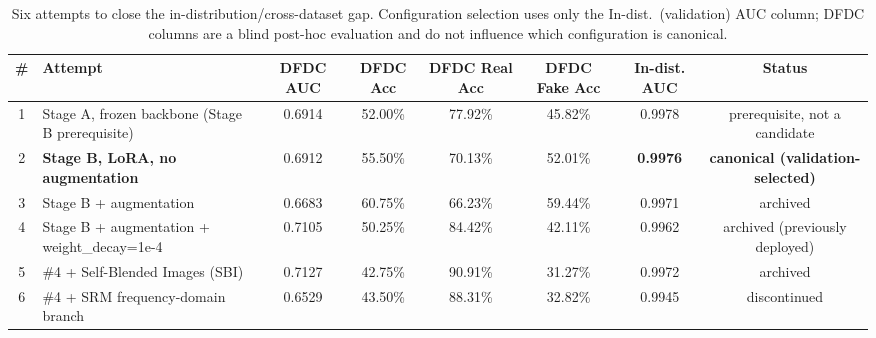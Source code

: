 \documentclass[conference]{IEEEtran}
\begin{document}
\begin{table}[t]
\caption{Six attempts to close the in-distribution/cross-dataset gap. Configuration selection uses only the In-dist.\ (validation) AUC column; DFDC columns are a blind post-hoc evaluation and do not influence which configuration is canonical.}
\label{tab:generalization}
\centering
\begin{tabular}{@{}clccccc c@{}}
\toprule
\# & Attempt & DFDC AUC & DFDC Acc & DFDC Real Acc & DFDC Fake Acc & In-dist. AUC & Status \\
\midrule
1 & Stage A, frozen backbone (Stage B prerequisite) & 0.6914 & 52.00\% & 77.92\% & 45.82\% & 0.9978 & prerequisite, not a candidate \\
2 & \textbf{Stage B, LoRA, no augmentation} & 0.6912 & 55.50\% & 70.13\% & 52.01\% & \textbf{0.9976} & \textbf{canonical (validation-selected)} \\
3 & Stage B + augmentation & 0.6683 & 60.75\% & 66.23\% & 59.44\% & 0.9971 & archived \\
4 & Stage B + augmentation + weight\_decay=1e-4 & 0.7105 & 50.25\% & 84.42\% & 42.11\% & 0.9962 & archived (previously deployed) \\
5 & \#4 + Self-Blended Images (SBI) \cite{shiohara2022sbi} & 0.7127 & 42.75\% & 90.91\% & 31.27\% & 0.9972 & archived \\
6 & \#4 + SRM frequency-domain branch \cite{fridrich2012srm} & 0.6529 & 43.50\% & 88.31\% & 32.82\% & 0.9945 & discontinued \\
\bottomrule
\end{tabular}
\end{table}
\end{document}
